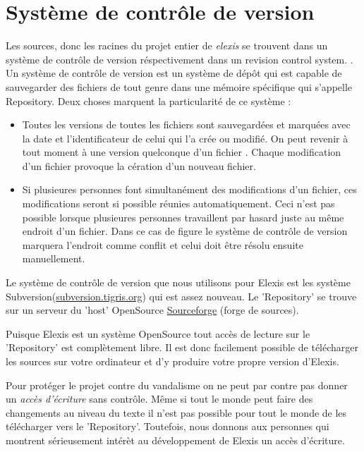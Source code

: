 \section{Système de contrôle de version}
Les sources, donc les racines du projet entier de \textit{elexis}  se trouvent dans un système de contrôle de version 
 réspectivement dans un 
\glqq revision control system\grqq. . Un système de contrôle de version est un système de dépôt qui est capable de sauvegarder des fichiers de tout genre  dans une mémoire spécifique qui s'appelle \glqq
Repository\grqq {}. Deux choses marquent la particularité de ce système :
\begin{itemize}
\item Toutes les versions de toutes les fichiers sont sauvegardées et marquées avec la date et l'identificateur de celui qui l'a crée ou modifié. On peut revenir à tout moment à une version quelconque d'un fichier . Chaque modification d'un fichier provoque la cération d'un nouveau fichier.
\item Si plusieures personnes font simultanément des modifications d'un fichier, ces modifications seront si possible réunies automatiquement. Ceci n'est pas possible lorsque plusieures personnes travaillent par hasard juste au même endroit d'un fichier. Dans ce cas de figure le système de contrôle de version marquera l'endroit comme conflit et celui doit être résolu ensuite manuellement.
\end{itemize}

Le système de contrôle de version que nous utilisons pour Elexis est les système  \glqq
Sub\-ver\-sion\grqq (\href{http://subversion.tigris.org}{subversion.tigris.org}) qui est assez nouveau. 
Le 'Repository' se trouve sur un serveur du 'host' OpenSource \href{http://www.sourceforge.net}{Sourceforge} (\glqq forge de sources\grqq).

Puisque Elexis est un système OpenSource tout accès de lecture sur le 'Repository' est complètement libre. Il est donc facilement possible de télécharger les sources sur votre ordinateur et d'y produire votre propre version d'Elexis.   

Pour protéger le projet contre du vandalisme on ne peut par contre pas donner un \textit{accès d'écriture} sans contrôle. Même si tout le monde peut faire des changements au niveau du texte il n'est pas possible pour tout le monde de les télécharger vers le 'Repository'. Toutefois, nous donnons aux personnes qui montrent sérieusement intérèt au développement de Elexis un accès d'écriture.

